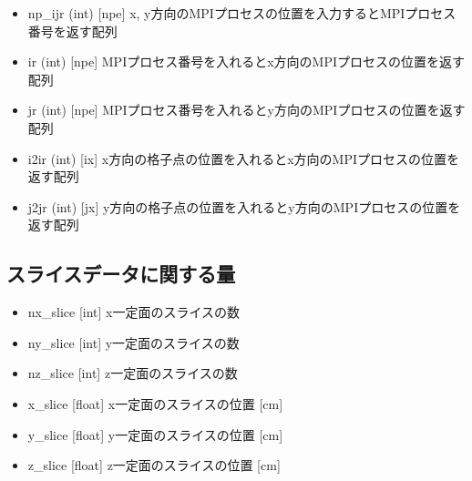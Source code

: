 \documentclass[letterpaper,10pt,dvipdfmx,report]{sphinxmanual}
\begin{document}
\begin{itemize}
\item {} 
\sphinxAtStartPar
np\_ijr (int) {[}npe{]} \sphinxhyphen{}\sphinxhyphen{} x, y方向のMPIプロセスの位置を入力するとMPIプロセス番号を返す配列

\item {} 
\sphinxAtStartPar
ir (int) {[}npe{]} \sphinxhyphen{}\sphinxhyphen{} MPIプロセス番号を入れるとx方向のMPIプロセスの位置を返す配列

\item {} 
\sphinxAtStartPar
jr (int) {[}npe{]} \sphinxhyphen{}\sphinxhyphen{} MPIプロセス番号を入れるとy方向のMPIプロセスの位置を返す配列

\item {} 
\sphinxAtStartPar
i2ir (int) {[}ix{]} \sphinxhyphen{}\sphinxhyphen{} x方向の格子点の位置を入れるとx方向のMPIプロセスの位置を返す配列

\item {} 
\sphinxAtStartPar
j2jr (int) {[}jx{]} \sphinxhyphen{}\sphinxhyphen{} y方向の格子点の位置を入れるとy方向のMPIプロセスの位置を返す配列

\end{itemize}


\subsection{スライスデータに関する量}
\label{\detokenize{notation:id4}}\begin{itemize}
\item {} 
\sphinxAtStartPar
nx\_slice {[}int{]} \sphinxhyphen{}\sphinxhyphen{} x一定面のスライスの数

\item {} 
\sphinxAtStartPar
ny\_slice {[}int{]} \sphinxhyphen{}\sphinxhyphen{} y一定面のスライスの数

\item {} 
\sphinxAtStartPar
nz\_slice {[}int{]} \sphinxhyphen{}\sphinxhyphen{} z一定面のスライスの数

\item {} 
\sphinxAtStartPar
x\_slice {[}float{]} \sphinxhyphen{}\sphinxhyphen{} x一定面のスライスの位置 {[}cm{]}

\item {} 
\sphinxAtStartPar
y\_slice {[}float{]} \sphinxhyphen{}\sphinxhyphen{} y一定面のスライスの位置 {[}cm{]}

\item {} 
\sphinxAtStartPar
z\_slice {[}float{]} \sphinxhyphen{}\sphinxhyphen{} z一定面のスライスの位置 {[}cm{]}

\end{itemize}
\end{document}
